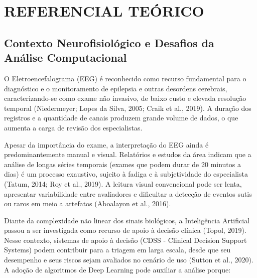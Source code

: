 \chapter{REFERENCIAL TEÓRICO}
\section{Contexto Neurofisiológico e Desafios da Análise Computacional}
O Eletroencefalograma (EEG) é reconhecido como recurso fundamental para o diagnóstico e o monitoramento de epilepsia e outras desordens cerebrais, caracterizando-se como exame não invasivo, de baixo custo e elevada resolução temporal (Niedermeyer; Lopes da Silva, 2005; Craik et al., 2019). A duração dos registros e a quantidade de canais produzem grande volume de dados, o que aumenta a carga de revisão dos especialistas.

Apesar da importância do exame, a interpretação do EEG ainda é predominantemente manual e visual. Relatórios e estudos da área indicam que a análise de longas séries temporais (exames que podem durar de 20 minutos a dias) é um processo exaustivo, sujeito à fadiga e à subjetividade do especialista (Tatum, 2014; Roy et al., 2019). A leitura visual convencional pode ser lenta, apresentar variabilidade entre avaliadores e dificultar a detecção de eventos sutis ou raros em meio a artefatos (Aboalayon et al., 2016).

Diante da complexidade não linear dos sinais biológicos, a Inteligência Artificial passou a ser investigada como recurso de apoio à decisão clínica (Topol, 2019). Nesse contexto, sistemas de apoio à decisão (CDSS - Clinical Decision Support Systems) podem contribuir para a triagem em larga escala, desde que seu desempenho e seus riscos sejam avaliados no cenário de uso (Sutton et al., 2020). A adoção de algoritmos de Deep Learning pode auxiliar a análise porque:

